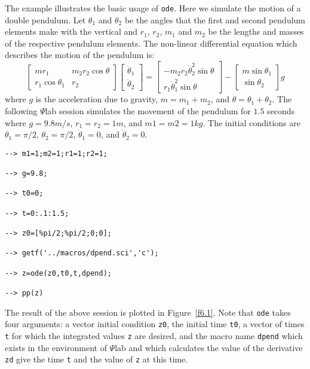 	The example illustrates the basic usage of {\tt ode}.
Here we simulate the motion of a double pendulum.  
Let $\theta_1$ and $\theta_2$ be the angles that the first
and second pendulum elements make with the vertical and
$r_1$, $r_2$, $m_1$
and $m_2$ be the lengths and masses of 
the respective pendulum elements.  
The non-linear
differential equation which describes the motion of the pendulum
is:
\begin{equation}
\left[\begin{array}{cc}
mr_1&m_2r_2\cos\theta\\
r_1\cos\theta_1&r_2
\end{array}\right]
\left[\begin{array}{c}
\ddot{\theta}_1\\
\ddot{\theta}_2
\end{array}\right]
=
\left[\begin{array}{c}
-m_2r_2\dot{\theta}_2^2\sin\theta\\
r_1\dot{\theta}_1^2\sin\theta
\end{array}\right]
-
\left[\begin{array}{c}
m\sin\theta_1\\
\sin\theta_2
\end{array}\right]
g
\label{e6.1}
\end{equation}
where $g$ is the acceleration due to gravity, $m=m_1+m_2$, and 
$\theta=\theta_1+\theta_2$.
The following $\Psi$lab session simulates the movement
of the pendulum for $1.5$ seconds where $g=9.8m/s$,
$r_1=r_2=1m$, and $m1=m2=1kg$.  The initial conditions are
$\theta_1=\pi/2$, $\theta_2=\pi/2$, $\dot{\theta}_1=0$, and 
$\dot{\theta}_2=0$.
\begin{verbatim}
--> m1=1;m2=1;r1=1;r2=1;
 
--> g=9.8;
 
--> t0=0;
 
--> t=0:.1:1.5;
 
--> z0=[%pi/2;%pi/2;0;0];
 
--> getf('../macros/dpend.sci','c');
 
--> z=ode(z0,t0,t,dpend);
 
--> pp(z)
\end{verbatim}
The result of the above session is plotted in Figure~\ref{f6.1}.
Note that {\tt ode} takes four arguments: a vector initial condition
{\tt z0}, the initial time {\tt t0}, a vector of times {\tt t}
for which the integrated values {\tt z} are desired, and the macro
name {\tt dpend} which exists in the environment of $\Psi$lab and which
calculates the value of the derivative {\tt zd} give the time {\tt t} 
and the value of {\tt z} at this time.

